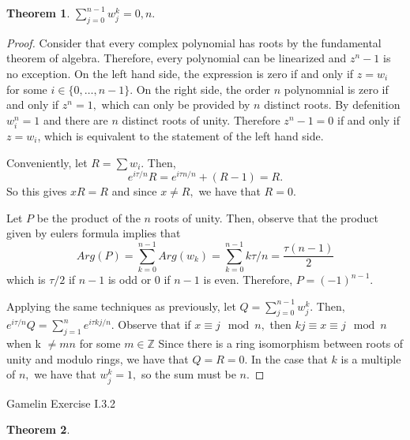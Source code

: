 \documentclass[letter]{article}
\newtheorem{theorem}{Theorem}
\newenvironment{menumerate}{%
  \edef\backupindent{\the\parindent}%
  \enumerate%
  \setlength{\parindent}{\backupindent}%
}{\endenumerate}
\begin{document}
\begin{menumerate}
\begin{theorem}
\begin{menumerate}
            \item $\sum_{j=0}^{n-1}w_j^k = 0, n.$
        \end{menumerate}
    \end{theorem}
    \begin{proof}
        \begin{menumerate}
            \item Consider that every complex polynomial has roots by the fundamental theorem of algebra.
            Therefore, every polynomial can be linearized and $z^n -1$ is no exception. On the left hand side, the expression
            is zero if and only if $z = w_i$ for some $i \in \{0,\dots,n-1\}.$ On the right side, the order $n$ polynomnial is
            zero if and only if $z^n = 1,$ which can only be provided by $n$ distinct roots. By defenition $w_i^n = 1$
            and there are $n$ distinct roots of unity. Therefore $z^n - 1 = 0$ if and only if $z = w_i$, which is equivalent
            to the statement of the left hand side.
            \item Conveniently, let $R = \sum w_i.$ Then,
            \begin{equation}
                e^{i\tau/n}R = e^{i\tau n/n} + (R - 1) = R.
            \end{equation}
            So this gives $xR=R$ and since $x \neq R,$ we have that $R = 0.$
            \item Let $P$ be the product of the $n$ roots of unity. Then, observe that 
            the product given by eulers formula implies that 
                $$Arg(P) = \sum_{k=0}^{n-1} Arg(w_k) = \sum_{k=0}^{n-1} k\tau/n = \frac{\tau (n-1)}{2}$$
            which is $\tau/2$ if $n-1$ is odd or $0$ if $n-1$ is even. Therefore, $P = (-1)^{n-1}.$
            \item Applying the same techniques as previously, let $Q = \sum_{j=0}^{n-1}w_j^k.$ Then,
            $e^{i\tau/n}Q = \sum_{j=1}^{n} e^{i\tau kj/n}.$
            Observe that if $x \equiv j \mod n,$ then $kj \equiv x \equiv j\mod n$ when k $\neq mn$ for some $m \in \mathbb{Z}$ Since there is
            a ring isomorphism between roots of unity and modulo rings, we have that $Q = R = 0.$ In  the case that $k$ is a multiple
            of $n,$ we have that $w_j^k = 1,$ so the sum must be $n.$
        \end{menumerate}
    \end{proof}
    \item Gamelin Exercise I.3.2
    \begin{theorem}

\end{theorem}
\end{menumerate}
\end{document}
